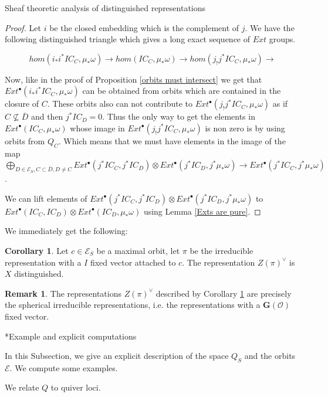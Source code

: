 \documentclass[12pt]{article}
\newcommand{\s}{\mathcal{O}}
\newcommand{\<}{\langle}
\renewcommand{\>}{\rangle}
\theoremstyle{plain}
\theoremstyle{definition}
\newtheorem{Remark}[theorem]{Remark}
\newtheorem{cor}[theorem]{Corollary}
\begin{document}
\begin{section}{Sheaf theoretic analysis of distinguished representations}
\begin{proof}
    Let $i$ be the closed embedding which is the complement of $j$. We have the following distinguished triangle which gives a long exact sequence of $Ext$ groups.

    $$hom(i_*i^*IC_C,\mu_*\omega)\rightarrow hom(IC_C,\mu_*\omega) \rightarrow hom(j_!j^*IC_C,\mu_*\omega) \rightarrow$$

    Now, like in the proof of Proposition \ref{orbits must intersect} we get that $Ext^\bullet(i_*i^*IC_C,\mu_*\omega)$ can be obtained from orbits which are contained in the closure of $C$. These orbits also can not contribute to $Ext^\bullet(j_!j^*IC_C,\mu_*\omega)$ as if $C\nsubseteq \overline{D}$ and then $j^*IC_D=0$. Thus the only way to get the elements in $Ext^\bullet(IC_C,\mu_*\omega)$ whose image in $Ext^\bullet(j_!j^*IC_C,\mu_*\omega)$ is non zero is by using orbits from $Q_C$. Which means that we must have 
    elements in the image of the map $\bigoplus_{D\in\mathcal{E}_S,C\subset \overline{D},D\neq C}Ext^{\bullet}(j^*IC_C,j^*IC_D)\otimes Ext^\bullet(j^*IC_D,j^*\mu_*\omega)\rightarrow Ext^\bullet(j^*IC_C,j^*\mu_*\omega)$.

    We can lift elements of $Ext^{\bullet}(j^*IC_C,j^*IC_D)\otimes Ext^\bullet(j^*IC_D,j^*\mu_*\omega)$ to $Ext^{\bullet}(IC_C,IC_D)\otimes Ext^\bullet(IC_D,\mu_*\omega)$ using Lemma \ref{Exts are pure}.
\end{proof}

We immediately get the following:

\begin{cor}\label{maximal orbits}
    Let $c\in \mathcal{E}_S$ be a maximal orbit, let $\pi$ be the irreducible representation with a $I$ fixed vector attached to $c$. The representation $Z(\pi)^\vee$ is $X$ distinguished.
\end{cor}

\begin{Remark}
    The representations $Z(\pi)^\vee$ described by Corollary \ref{maximal orbits} are precisely the spherical irreducible representations, i.e. the representations with a $\mathbf{G}(\s)$ fixed vector. 
\end{Remark}

\begin{subsection}*{Example and explicit computations}

In this Subsection, we give an explicit description of the space $Q_S$ and the orbits $\mathcal{E}$. We compute some examples.
    

We relate $Q$ to quiver loci. 


\end{subsection}
\end{section}
\end{document}
